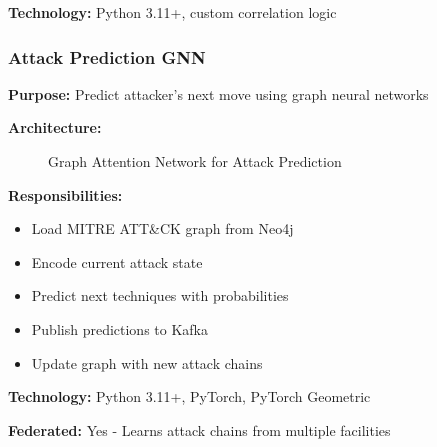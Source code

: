 \documentclass[12pt,a4paper]{article}
\begin{document}
\textbf{Technology:} Python 3.11+, custom correlation logic

\subsubsection{Attack Prediction GNN}

\textbf{Purpose:} Predict attacker's next move using graph neural networks

\textbf{Architecture:}

\begin{figure}[H]
\centering
{}
\caption{Graph Attention Network for Attack Prediction}
\end{figure}

\textbf{Responsibilities:}
\begin{itemize}[leftmargin=1cm,itemsep=0pt]
    \item Load MITRE ATT\&CK graph from Neo4j
    \item Encode current attack state
    \item Predict next techniques with probabilities
    \item Publish predictions to Kafka
    \item Update graph with new attack chains
\end{itemize}

\textbf{Technology:} Python 3.11+, PyTorch, PyTorch Geometric

\textbf{Federated:} Yes - Learns attack chains from multiple facilities
\end{document}

